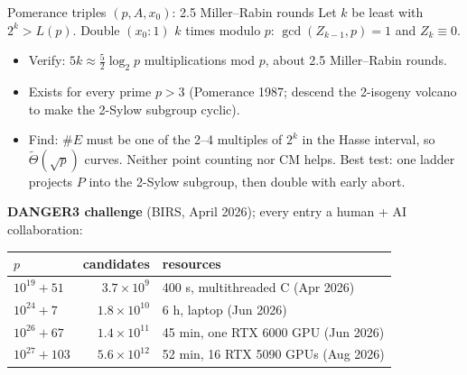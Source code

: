 \documentclass[aspectratio=169,11pt]{beamer}
\newcommand{\Tt}{\widetilde{\Theta}}
\newcommand{\find}[1]{{\color{fred}#1}}
\newcommand{\ver}[1]{{\color{vblue}#1}}
\begin{document}
\begin{frame}{Pomerance triples $(p, A, x_0)$: 2.5 Miller--Rabin rounds}
Let $k$ be least with $2^k > L(p)$.  Double $(x_0:1)$ $k$ times modulo $p$:
$\gcd(Z_{k-1},p) = 1$ and $Z_k \equiv 0$.
\begin{itemize}
\item \ver{Verify:} $5k \approx \tfrac52\log_2 p$ multiplications mod $p$, about
\ver{2.5 Miller--Rabin rounds}.
\item Exists for every prime $p>3$ (Pomerance 1987; descend the 2-isogeny volcano to make the
2-Sylow subgroup cyclic).
\item \find{Find:} $\#E$ must be one of the 2--4 multiples of $2^k$ in the Hasse interval, so
\find{$\Tt(\sqrt p)$ curves}.  Neither point counting nor CM helps.
Best test: one ladder projects $P$ into the 2-Sylow subgroup, then double with early abort.
\end{itemize}
\smallskip
\textbf{DANGER3 challenge} (BIRS, April 2026); every entry a human + AI collaboration:
\vspace{-0.3em}
\begin{center}\footnotesize
\begin{tabular}{@{}lrl@{}}
\toprule
$p$ & candidates & resources\\
\midrule
$10^{19}+51$ & $3.7\times 10^{9}$ & 400 s, multithreaded C (Apr 2026)\\
$10^{24}+7$ & $1.8\times 10^{10}$ & 6 h, laptop (Jun 2026)\\
$10^{26}+67$ & $1.4\times 10^{11}$ & 45 min, one RTX 6000 GPU (Jun 2026)\\
$10^{27}+103$ & $5.6\times 10^{12}$ & 52 min, 16 RTX 5090 GPUs (Aug 2026)\\
\bottomrule
\end{tabular}
\end{center}
\end{frame}
\end{document}
